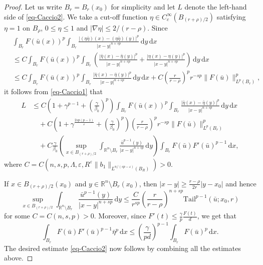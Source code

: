 \documentclass[10pt,a4paper]{amsart}
\begin{document}
\begin{proof}
Let us write $B_r = B_r(x_0)$ for simplicity and let $L$ denote the left-hand side of \eqref{eq-Caccio2}. We take a cut-off function $\eta \in C_c^{\infty}(B_{(r+\rho)/2})$ satisfying $\eta = 1$ on $B_\rho$, $0 \leq \eta \leq 1$ and $|\nabla \eta| \leq 2/(r-\rho)$. Since
\begin{equation*}
\begin{split}
&\int_{B_r} F(\bar{u}(x))^p \int_{B_r} \frac{|(\eta\bar{\eta})(x)-(\eta\bar{\eta})(y)|^p}{|x-y|^{n+sp}} \,\mathrm{d}y\,\mathrm{d}x \\
&\leq C \int_{B_r} F(\bar{u}(x))^p \int_{B_r} \left( \frac{|\bar{\eta}(x)-\bar{\eta}(y)|^p}{|x-y|^{n+sp}} + \frac{|\eta(x)-\eta(y)|^p}{|x-y|^{n+sp}} \right) \,\mathrm{d}y\,\mathrm{d}x \\
&\leq C \int_{B_r} F(\bar{u}(x))^p \int_{B_r} \frac{|\bar{\eta}(x)-\bar{\eta}(y)|^p}{|x-y|^{n+sp}} \,\mathrm{d}y\,\mathrm{d}x + C \left( \frac{r}{r-\rho} \right)^p r^{-sp} \|F(\bar{u})\|_{L^p(B_r)}^p,
\end{split}
\end{equation*}
it follows from \eqref{eq-Caccio1} that
\begin{equation*}
\begin{split}
L
&\leq C\left( 1+\gamma^{p-1}+\left( \frac{\gamma}{\beta_0} \right)^p \right) \int_{B_r} F(\bar{u}(x))^p \int_{B_r} \frac{|\bar{\eta}(x)-\bar{\eta}(y)|^p}{|x-y|^{n+sp}} \,\mathrm{d}y\,\mathrm{d}x \\
&\quad + C\left( 1+\gamma^{\frac{2sp(p-1)}{\varepsilon}}+\left( \frac{\gamma}{\beta_0} \right)^p \right) \left( \frac{r}{r-\rho} \right)^p r^{-sp} \|F(\bar{u})\|_{L^p(B_r)}^p \\
&\quad + C \frac{\gamma}{\beta_0} \left( \sup_{x \in B_{(r+\rho)/2}} \int_{\mathbb{R}^n \setminus B_r} \frac{\bar{u}^{p-1}(y)}{|x-y|^{n+sp}} \,\mathrm{d}y \right) \int_{B_r} F(\bar{u}) F'(\bar{u})^{p-1} \,\mathrm{d}x,
\end{split}
\end{equation*}
where $C=C(n, s, p, \Lambda, \varepsilon, R^{\varepsilon}\|b_1\|_{L^{n/(sp-\varepsilon)}(B_R)})>0$.

If $x \in B_{(r+\rho)/2}(x_0)$ and $y \in \mathbb{R}^n \setminus B_r(x_0)$, then $|x-y| \geq \frac{r-\rho}{2r}|y-x_0|$ and hence
\begin{equation*}
\sup_{x \in B_{(r+\rho)/2}} \int_{\mathbb{R}^n \setminus B_r} \frac{\bar{u}^{p-1}(y)}{|x-y|^{n+sp}} \,\mathrm{d}y \leq \frac{C}{r^{sp}} \left( \frac{r}{r-\rho} \right)^{n+sp} \mathrm{Tail}^{p-1}(\bar{u}; x_0, r)
\end{equation*}
for some $C=C(n, s, p)>0$. Moreover, since $F'(t) \leq \frac{\gamma}{p}\frac{F(t)}{d}$, we get that
\begin{equation*}
\int_{B_r} F(\bar{u}) F'(\bar{u})^{p-1} \bar{\eta}^p \,\mathrm{d}x \leq \left( \frac{\gamma}{pd} \right)^{p-1} \int_{B_r} F(\bar{u})^p \,\mathrm{d}x.
\end{equation*}
The desired estimate \eqref{eq-Caccio2} now follows by combining all the estimates above.
\end{proof}
\end{document}
